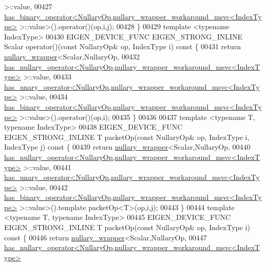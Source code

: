\begin{DoxyCode}
       >::value,
00427     \hyperlink{struct_eigen_1_1internal_1_1has__binary__operator}{has\_binary\_operator<NullaryOp,nullary\_wrapper\_workaround\_msvc<IndexType>}
       >::value>().\textcolor{keyword}{operator}()(op,i,j);
00428   \}
00429   \textcolor{keyword}{template} <\textcolor{keyword}{typename} IndexType>
00430   EIGEN\_DEVICE\_FUNC EIGEN\_STRONG\_INLINE Scalar operator()(\textcolor{keyword}{const} NullaryOp& op, IndexType i)\textcolor{keyword}{ const }\{
00431     \textcolor{keywordflow}{return} \hyperlink{struct_eigen_1_1internal_1_1nullary__wrapper}{nullary\_wrapper}<Scalar,NullaryOp,
00432     \hyperlink{struct_eigen_1_1internal_1_1has__nullary__operator}{has\_nullary\_operator<NullaryOp,nullary\_wrapper\_workaround\_msvc<IndexType>}
       >::value,
00433     \hyperlink{struct_eigen_1_1internal_1_1has__unary__operator}{has\_unary\_operator<NullaryOp,nullary\_wrapper\_workaround\_msvc<IndexType>}
       >::value,
00434     \hyperlink{struct_eigen_1_1internal_1_1has__binary__operator}{has\_binary\_operator<NullaryOp,nullary\_wrapper\_workaround\_msvc<IndexType>}
       >::value>().\textcolor{keyword}{operator}()(op,i);
00435   \}
00436 
00437   \textcolor{keyword}{template} <\textcolor{keyword}{typename} T, \textcolor{keyword}{typename} IndexType>
00438   EIGEN\_DEVICE\_FUNC EIGEN\_STRONG\_INLINE T packetOp(\textcolor{keyword}{const} NullaryOp& op, IndexType i, IndexType j)\textcolor{keyword}{ const }\{
00439     \textcolor{keywordflow}{return} \hyperlink{struct_eigen_1_1internal_1_1nullary__wrapper}{nullary\_wrapper}<Scalar,NullaryOp,
00440     \hyperlink{struct_eigen_1_1internal_1_1has__nullary__operator}{has\_nullary\_operator<NullaryOp,nullary\_wrapper\_workaround\_msvc<IndexType>}
       >::value,
00441     \hyperlink{struct_eigen_1_1internal_1_1has__unary__operator}{has\_unary\_operator<NullaryOp,nullary\_wrapper\_workaround\_msvc<IndexType>}
       >::value,
00442     \hyperlink{struct_eigen_1_1internal_1_1has__binary__operator}{has\_binary\_operator<NullaryOp,nullary\_wrapper\_workaround\_msvc<IndexType>}
       >::value>().\textcolor{keyword}{template} packetOp<T>(op,i,j);
00443   \}
00444   \textcolor{keyword}{template} <\textcolor{keyword}{typename} T, \textcolor{keyword}{typename} IndexType>
00445   EIGEN\_DEVICE\_FUNC EIGEN\_STRONG\_INLINE T packetOp(\textcolor{keyword}{const} NullaryOp& op, IndexType i)\textcolor{keyword}{ const }\{
00446     \textcolor{keywordflow}{return} \hyperlink{struct_eigen_1_1internal_1_1nullary__wrapper}{nullary\_wrapper}<Scalar,NullaryOp,
00447     \hyperlink{struct_eigen_1_1internal_1_1has__nullary__operator}{has\_nullary\_operator<NullaryOp,nullary\_wrapper\_workaround\_msvc<IndexType>}

\end{DoxyCode}
